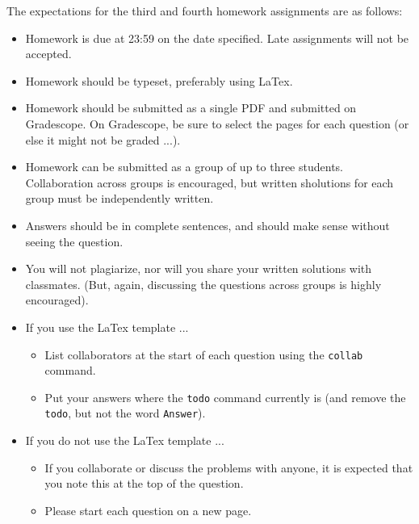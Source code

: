 The expectations for the third and fourth homework assignments are as follows:
\begin{itemize}
    \item Homework is due at 23:59 on the date specified.  Late assignments will
        not be accepted.
    \item Homework should be typeset, preferably using LaTex.
    \item Homework should be submitted as a single PDF and submitted on
        Gradescope.  On Gradescope, be sure to select the pages for each
        question (or else it might not be graded ...).
    \item Homework can be submitted as a group of up to three students.
        Collaboration across groups is encouraged, but written sholutions for
        each group must be independently written.
    \item Answers should be in complete sentences, and should make sense without
        seeing the question.
    \item You will not plagiarize, nor will you share your written solutions
        with classmates.  (But, again, discussing the questions across groups is highly encouraged).
    \item If you use the LaTex template ...
        \begin{itemize}
            \item List collaborators at the start of each question using the \texttt{collab} command.
            \item Put your answers where the \texttt{todo} command currently is (and
                remove the \texttt{todo}, but not the word \texttt{Answer}).
        \end{itemize}
    \item If you do not use the LaTex template ...
        \begin{itemize}
            \item If you collaborate or discuss the problems with anyone, it is
                expected that you note this at the top of the question.
            \item Please start each question on a new page.
        \end{itemize}
\end{itemize}

